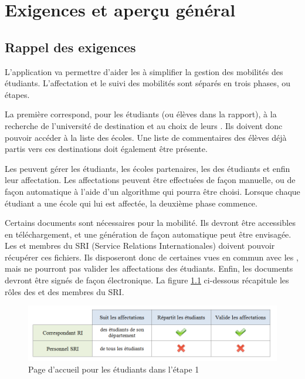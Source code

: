 \chapter{Exigences et aperçu général}
\label{chap::exigences}


\section{Rappel des exigences}

L'application va permettre d'aider les \ris à simplifier la gestion des mobilités des étudiants. L'affectation et le suivi des mobilités sont séparés en trois phases, ou étapes. 


\bigbreak

La première correspond, pour les étudiants (ou élèves dans la rapport), à la recherche de l'université de destination et au choix de leurs \voe. Ils doivent donc pouvoir accéder à la liste des écoles. Une liste de commentaires des élèves déjà partis vers ces destinations doit également être présente.

Les \ris peuvent gérer les étudiants, les écoles partenaires, les \voe des étudiants et enfin leur affectation. Les affectations peuvent être effectuées de façon manuelle, ou de façon automatique à l'aide d'un algorithme qui pourra être choisi. Lorsque chaque étudiant a une école qui lui est affectée, la deuxième phase commence.
\bigbreak

Certains documents sont nécessaires pour la mobilité. Ils devront être accessibles en téléchargement, et une génération de façon automatique peut être envisagée. Les \ris et membres du SRI (Service Relations Internationales) doivent pouvoir récupérer ces fichiers. Ils disposeront donc de certaines vues en commun avec les \ris, mais ne pourront pas valider les affectations des étudiants. Enfin, les documents devront être signés de façon électronique. La figure \ref{fig::diffRI-SRI} ci-dessous récapitule les rôles des \ris et des membres du SRI.

\begin{figure}[H]
	\centering
	\includegraphics[scale=0.4]{roleRI-SRI.png}
	\caption{Page d'accueil pour les étudiants dans l'étape 1}
	\label{fig::diffRI-SRI}
\end{figure}
\bigbreak


